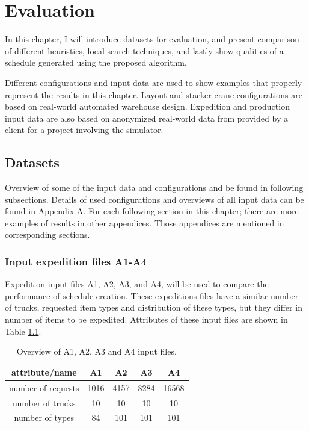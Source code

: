 \documentclass{ctuthesis}
\begin{document}
\chapter{Evaluation}
\label{ch:Evaluation}

In this chapter, I will introduce datasets for evaluation, and present comparison of different heuristics, local search techniques, and lastly show qualities of a schedule generated using the proposed algorithm.

Different configurations and input data are used to show examples that properly represent the results in this chapter. Layout and stacker crane configurations are based on real-world automated warehouse design. Expedition and production input data are also based on anonymized real-world data from provided by a client for a project involving the simulator.

\section{Datasets}
Overview of some of the input data and configurations and be found in following subsections. Details of used configurations and overviews of all input data can be found in Appendix A. For each following section in this chapter; there are more examples of results in other appendices. Those appendices are mentioned in corresponding sections.


\subsection{Input expedition files A1-A4}
\label{subsec:dataA}

Expedition input files A1, A2, A3, and A4, will be used to compare the performance of schedule creation. These expeditions files have a similar number of trucks, requested item types and distribution of these types, but they differ in number of items to be expedited. Attributes of these input files are shown in Table \ref{tab:in1}.

\begin{table}[H]
\begin{tabular}{ |c| c c c c|} 
\hline
attribute/name & A1 & A2 & A3 & A4\\ 
\hline
number of requests & 1016 & 4157 & 8284 & 16568 \\
\hline
number of trucks & 10 & 10 & 10 & 10 \\ 
\hline
number of types & 84 & 101 & 101 & 101 \\ 
\hline
\end{tabular}
\caption{Overview of A1, A2, A3 and A4 input files.} \label{tab:in1}
\end{table}
\end{document}
